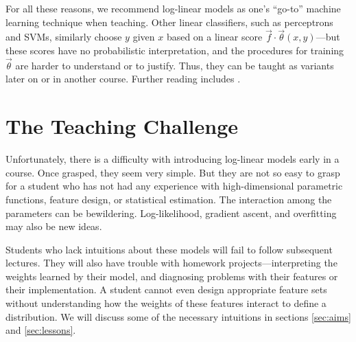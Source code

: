 \documentclass[11pt,letterpaper]{article}
\begin{document}

For all these reasons, we recommend log-linear models as one's
``go-to'' machine learning technique when teaching.  Other linear
classifiers, such as perceptrons and SVMs, similarly choose $y$ given
$x$ based on a linear score $\vec{f} \cdot \vec{\theta}(x,y)$---but
these scores have no probabilistic interpretation, and the procedures
for training $\vec{\theta}$ are harder to understand or to justify.
Thus, they can be taught as variants later on or in another course.
Further reading includes \cite{smith-2011}.

\section{The Teaching Challenge} \label{sec:challenges}

Unfortunately, there is a difficulty with introducing log-linear
models early in a course.  Once grasped, they seem very simple.  But
they are not so easy to grasp for a student who has not had any
experience with high-dimensional parametric functions, feature
design, or statistical estimation.  The interaction among the parameters can be
bewildering.  Log-likelihood, gradient ascent, and overfitting may also
be new ideas.

Students who lack intuitions about these models will fail to follow
subsequent lectures.  They will also have trouble with homework
projects---interpreting the weights learned by their model, and
diagnosing problems with their features or their implementation.  A
student cannot even design appropriate feature sets without
understanding how the weights of these features interact to define a
distribution.  We will discuss some of the necessary intuitions in
sections \ref{sec:aims} and \ref{sec:lessons}.
\end{document}
